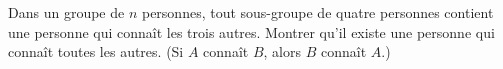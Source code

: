 Dans un groupe de $n$ personnes, tout sous-groupe de quatre personnes contient une personne qui connaît les trois autres. Montrer qu'il existe une personne qui connaît toutes les autres. (Si $A$ connaît $B$, alors $B$ connaît $A$.)
